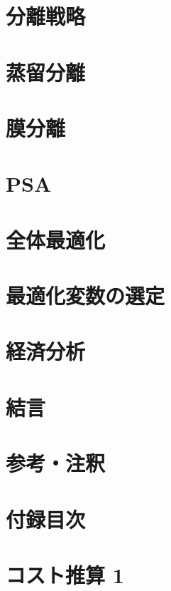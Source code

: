\documentclass[
  11pt,
  aspectratio=43,           %
  dvipsnames,
]{beamer}
\begin{document}
\section{分離戦略}


\section{蒸留分離}


\section{膜分離}


\section{PSA}


\section{全体最適化}


\section{最適化変数の選定}


\section{経済分析}


\section{結言}


\section{参考・注釈}


\section{付録目次}


\section{コスト推算 1}

\end{document}
